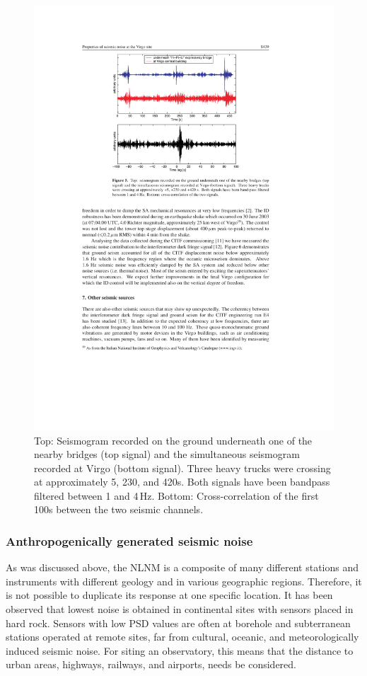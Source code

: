\begin{figure}[t!]
	\begin{center}
		\includegraphics[width=12cm]{./Sec_SiteInfra/Figures/VirgoRoadNoise.pdf}
		\caption{Top: Seismogram recorded on the ground underneath one of the nearby bridges (top signal) and the simultaneous seismogram recorded at Virgo (bottom signal). Three heavy trucks  were crossing at approximately 5, 230, and 420s. Both signals have been bandpass filtered between 1 and 4\,Hz. Bottom: Cross-correlation of the first 100s between the two seismic channels.}
		\label{roadnoise}
	\end{center}
\end{figure}

\FloatBarrier
\subsubsection*{Anthropogenically generated seismic noise}
As was discussed above, the NLNM is a composite of many different stations and instruments with different geology and in various geographic regions. Therefore, it is not possible to duplicate its response at one specific location. It has been observed that lowest noise is obtained in continental sites with sensors placed in hard rock. Sensors with low PSD values are often at borehole and subterranean stations operated at remote sites, far from cultural, oceanic, and meteorologically induced seismic noise. For siting an observatory, this means that the distance to urban areas, highways, railways, and airports, needs be considered. 

